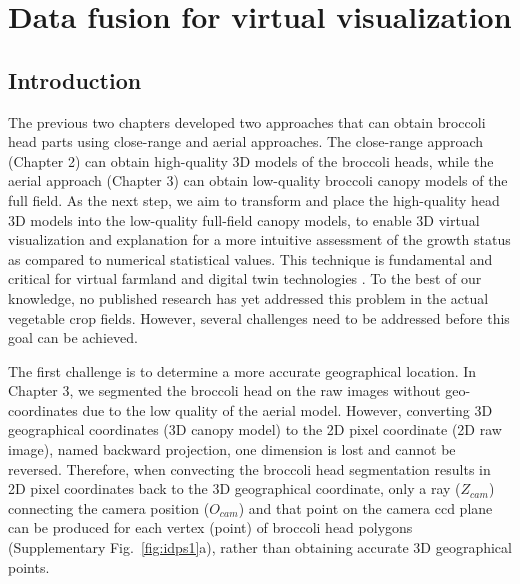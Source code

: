 \chapter{Data fusion for virtual visualization}

\section{Introduction}

The previous two chapters developed two approaches that can obtain broccoli head parts using close-range and aerial approaches. The close-range approach (Chapter 2) can obtain high-quality 3D models of the broccoli heads, while the aerial approach (Chapter 3) can obtain low-quality broccoli canopy models of the full field. As the next step, we aim to transform and place the high-quality head 3D models into the low-quality full-field canopy models, to enable 3D virtual visualization and explanation for a more intuitive assessment of the growth status as compared to numerical statistical values. This technique is fundamental and critical for virtual farmland and digital twin technologies \citep{pylianidis_introducing_2021, slob_virtual_2023}. To the best of our knowledge, no published research has yet addressed this problem in the actual vegetable crop fields. However, several challenges need to be addressed before this goal can be achieved.

The first challenge is to determine a more accurate geographical location. In Chapter 3, we segmented the broccoli head on the raw images without geo-coordinates due to the low quality of the aerial model. However, converting 3D geographical coordinates (3D canopy model) to the 2D pixel coordinate (2D raw image), named backward projection, one dimension is lost and cannot be reversed. Therefore, when convecting the broccoli head segmentation results in 2D pixel coordinates back to the 3D geographical coordinate, only a ray ($Z_{cam}$) connecting the camera position ($O_{cam}$) and that point on the camera \gls{ccd} plane can be produced for each vertex (point) of broccoli head polygons (Supplementary Fig.~\ref{fig:idps1}a), rather than obtaining accurate 3D geographical points.

